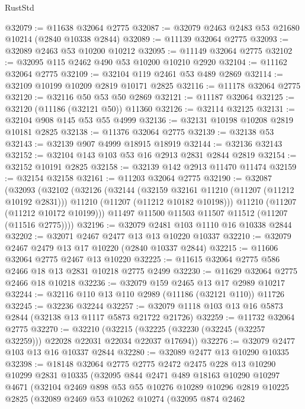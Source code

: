 \begin{lexlean}{RustStd}
\begin{coremodule}
@32079 := @11638 @32064 @2775
@32087 := @32079 @2463 @2483 @53 @21680 @10214 (@2840 @10338 @2844)
@32089 := @11139 @32064 @2775
@32093 := @32089 @2463 @53 @10200 @10212
@32095 := @11149 @32064 @2775
@32102 := @32095 @115 @2462 @490 @53 @10200 @10210 @2920
@32104 := @11162 @32064 @2775
@32109 := @32104 @119 @2461 @53 @489 @2869
@32114 := @32109 @10199 @10209 @2819 @10171 @2825
@32116 := @11178 @32064 @2775
@32120 := @32116 @50 @53 @50 @2869
@32121 := @11187 @32064
@32125 := @32120 (@11186 (@32121 @50)) @11360
@32126 := @32114 @32125
@32131 := @32104 @908 @145 @53 @55 @4999
@32136 := @32131 @10198 @10208 @2819 @10181 @2825
@32138 := @11376 @32064 @2775
@32139 := @32138 @53
@32143 := @32139 @907 @4999 @18915 @18919
@32144 := @32136 @32143
@32152 := @32104 @143 @103 @53 @16 @2913 @2831 @2844 @2819
@32154 := @32152 @10191 @2825
@32158 := @32139 @142 @2913 @11470 @11474
@32159 := @32154 @32158
@32161 := @11203 @32064 @2775
@32190 := @32087
    (@32093
      (@32102
        (@32126
          (@32144
            (@32159 @32161 @11210 (@11207 (@11212 @10192 @2831)))
            @11210
            (@11207 (@11212 @10182 @10198)))
          @11210
          (@11207 (@11212 @10172 @10199)))
        @11497
        @11500
        @11503
        @11507
        @11512
        (@11207 (@11516 @2775))))
@32196 := @32079 @2481 @103 @1110 @16 @10338 @2844
@32202 := @32071 @2467 @2477 @13 @13 @10220 @10337
@32210 := @32079 @2467 @2479 @13 @17 @10220 (@2840 @10337 @2844)
@32215 := @11606 @32064 @2775 @2467 @13 @10220
@32225 := @11615 @32064 @2775 @586 @2466 @18 @13 @2831 @10218 @2775 @2499
@32230 := @11629 @32064 @2775 @2466 @18 @10218
@32236 := @32079 @159 @2465 @13 @17 @2989 @10217
@32244 := @32116 @110 @13 @110 @2989 (@11186 (@32121 @110)) @11726
@32245 := @32236 @32244
@32257 := @32079 @1118 @103 @13 @16 @5873 @2844 (@32138 @13 @1117 @5873 @21722 @21726)
@32259 := @11732 @32064 @2775
@32270 := @32210
    (@32215 (@32225 (@32230 (@32245 (@32257 @32259))) @22028 @22031 @22034 @22037 @17694))
@32276 := @32079 @2477 @103 @13 @16 @10337 @2844
@32280 := @32089 @2477 @13 @10290 @10335
@32398 := @18148
    @32064
    @2775
    @2775
    @2472
    @2475
    @228
    @13
    @10290
    @10299
    @2831
    @10335
    (@32095
      @844
      @2471
      @489
      @18163
      @10290
      @10297
      @4671
      (@32104
        @2469
        @898
        @53
        @55
        @10276
        @10289
        @10296
        @2819
        @10225
        @2825
        (@32089
          @2469
          @53
          @10262
          @10274
          (@32095
            @874
            @2462

\end{coremodule}
\end{lexlean}
